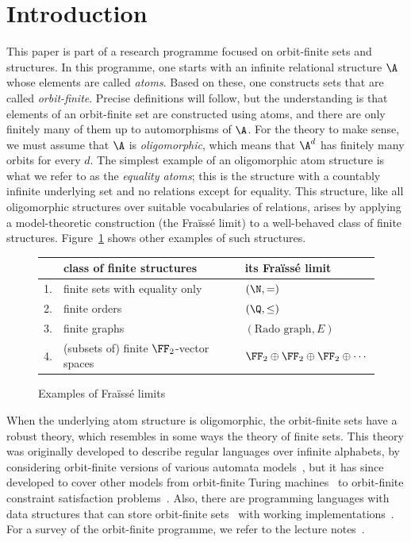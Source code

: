 \section{Introduction}
This paper is part of a research programme focused on orbit-finite sets and structures. 
In this programme, one starts with an infinite relational structure $\A$ whose elements are called \emph{atoms}. 
Based on these, one constructs sets that are called \emph{orbit-finite}. 
Precise definitions will follow, but the understanding is that elements of an orbit-finite set are constructed using atoms, and there are only finitely many of them up to automorphisms of $\A$. 
For the theory to make sense, we must assume that $\A$ is \emph{oligomorphic}, which means that $\A^d$ has finitely many orbits for every $d$. 
The simplest example of an oligomorphic atom structure is what we refer to as the \emph{equality atoms}; 
this is the structure with a countably infinite underlying set and no relations except for equality. 
This structure, like all oligomorphic structures over suitable vocabularies of relations, arises by applying a model-theoretic construction (the Fraïssé limit) to a well-behaved class of finite structures. 
Figure~\ref{fig:fraisse-limits} shows other examples of such structures. 
\begin{figure}
    \begin{center}
    \begin{tabular}{lll}
   &  class of finite structures & its Fraïssé limit\\
    \toprule
    1.& finite sets with equality only & $(\N, =)$ \\
    2.& finite orders & $(\Q, \leq)$ \\
    3.& finite graphs & $(\text{Rado graph}, E)$ \\ 
    4.& (subsets of) finite $\FF_2$-vector spaces & $\FF_2 \oplus \FF_2 \oplus \FF_2 \oplus \cdots$ 
    \\
    \bottomrule  
\end{tabular}
\end{center}
\caption{\label{fig:fraisse-limits} Examples of Fraïssé limits}
\end{figure}

When the underlying atom structure is oligomorphic, the orbit-finite sets have a robust theory, which resembles in some ways the theory of finite sets. 
This theory was originally developed to describe regular languages over infinite alphabets, by considering orbit-finite versions of various automata models~\cite{bojanczykNominalMonoids2013,bojanczykAutomataTheoryNominal2014}, but it has since developed to cover other models from orbit-finite Turing machines~\cite{bojanczykTuringMachinesAtoms2013} to orbit-finite constraint satisfaction problems~\cite{klin2015locally}.
Also, there are programming languages with data structures that can store  orbit-finite sets~\cite{bojanczyk2012towards,bojanczyk2012imperative} with working implementations~\cite{kopczynski2016lois, szynwelski-phd}. For a survey of the orbit-finite programme, we refer to the lecture notes~\cite{bojanczyk_slightly}. 

